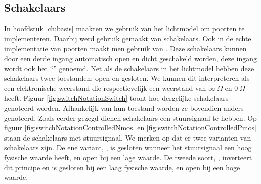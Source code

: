 \subsection{Schakelaars}
In hoofdstuk \ref{ch:basis} maakten we gebruik van het lichtmodel om poorten te implementeren. Daarbij werd gebruik gemaakt van schakelaars. Ook in de echte implementatie van poorten maakt men gebruik van . Deze schakelaars kunnen door een derde ingang automatisch open en dicht geschakeld worden, deze ingang wordt ook het ``'' genoemd. Net als de schakelaars in het lichtmodel hebben deze schakelaars twee toestanden: open en gesloten. We kunnen dit interpreteren als een elektronische weerstand die respectievelijk een weerstand van $\infty\ \Omega$ en $0\ \Omega$ heeft. Figuur \ref{fig:switchNotationSwitch} toont hoe dergelijke schakelaars genoteerd worden. Afhankelijk van hun toestand worden ze bovendien anders genoteerd. Zoals eerder gezegd dienen schakelaars een stuursignaal te hebben. Op figuur \ref{fig:switchNotationControlledNmos} en \ref{fig:switchNotationControlledPmos} staan de schakelaars met stuursignaal. We merken op dat er twee varianten van schakelaars zijn. De ene variant, , is gesloten wanneer het stuursignaal een hoog fysische waarde heeft, en open bij een lage waarde. De tweede soort, , inverteert dit principe en is gesloten bij een laag fysische waarde, en open bij een hoge waarde.

